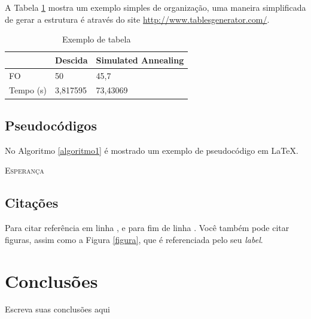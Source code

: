 \documentclass{article}
\begin{document}
A Tabela \ref{tabela} mostra um exemplo simples de organização, uma maneira simplificada de gerar a estrutura é através do site \url{http://www.tablesgenerator.com/}.
\begin{table}[h]
	\centering
	\begin{tabular}{lll}
		\hline
		& Descida  & Simulated Annealing \\ \hline
		FO        & 50       & 45,7                \\
		Tempo (s) & 3,817595 & 73,43069            \\ \hline
	\end{tabular}	
	\caption{Exemplo de tabela}
	\label{tabela}
\end{table}

\subsection{Pseudocódigos}

No Algoritmo \ref{algoritmo1} é mostrado um exemplo de pseudocódigo em \LaTeX.

\begin{algorithm}[H]
	\SetAlgoLined
	\label{algoritmo1}
	\caption{\textsc{Esperança}}
\end{algorithm}

\subsection{Citações}
Para citar referência em linha \cite{knuth:84}, e para fim de linha \citep{knuth:84}. Você também pode citar figuras, assim como a Figura \ref{figura}, que é referenciada pelo seu \textit{label}.

\section{Conclusões}
Escreva suas conclusões aqui



\end{document}
